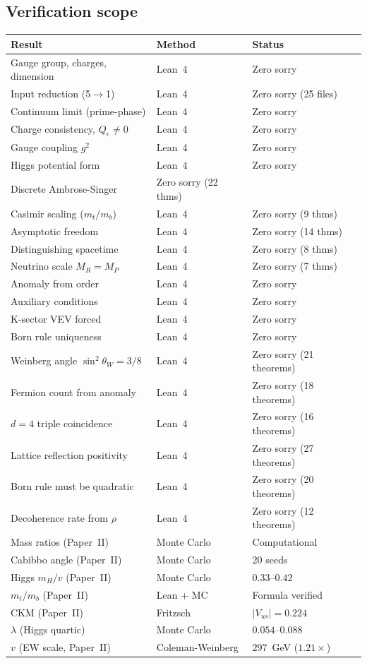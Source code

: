 \documentclass[11pt,letterpaper]{article}
\begin{document}
\subsection{Verification scope}

\begin{center}
\small
\begin{tabular}{@{}lll@{}}
\toprule
Result & Method & Status \\
\midrule
Gauge group, charges, dimension & Lean~4 & Zero sorry \\
Input reduction (5$\to$1) & Lean~4 & Zero sorry (25 files) \\
Continuum limit (prime-phase) & Lean~4 & Zero sorry \\
Charge consistency, $Q_e \neq 0$ & Lean~4 & Zero sorry \\
Gauge coupling $g^2$ & Lean~4 & Zero sorry \\
Higgs potential form & Lean~4 & Zero sorry \\
Discrete Ambrose-Singer & Zero sorry (22 thms) \\
Casimir scaling ($m_t/m_b$) & Lean~4 & Zero sorry (9 thms) \\
Asymptotic freedom & Lean~4 & Zero sorry (14 thms) \\
Distinguishing spacetime & Lean~4 & Zero sorry (8 thms) \\
Neutrino scale $M_R = M_P$ & Lean~4 & Zero sorry (7 thms) \\
Anomaly from order & Lean~4 & Zero sorry \\
Auxiliary conditions & Lean~4 & Zero sorry \\
K-sector VEV forced & Lean~4 & Zero sorry \\
Born rule uniqueness & Lean~4 & Zero sorry \\
Weinberg angle $\sin^2\theta_W = 3/8$ & Lean~4 & Zero sorry (21 theorems) \\
Fermion count from anomaly & Lean~4 & Zero sorry (18 theorems) \\
$d{=}4$ triple coincidence & Lean~4 & Zero sorry (16 theorems) \\
Lattice reflection positivity & Lean~4 & Zero sorry (27 theorems) \\
Born rule must be quadratic & Lean~4 & Zero sorry (20 theorems) \\
Decoherence rate from $\rho$ & Lean~4 & Zero sorry (12 theorems) \\
\midrule
Mass ratios (Paper~II) & Monte Carlo & Computational \\
Cabibbo angle (Paper~II) & Monte Carlo & 20 seeds \\
Higgs $m_H/v$ (Paper~II) & Monte Carlo & $0.33$--$0.42$ \\
$m_t/m_b$ (Paper~II) & Lean + MC & Formula verified \\
CKM (Paper~II) & Fritzsch & $|V_{us}| = 0.224$ \\
$\lambda$ (Higgs quartic) & Monte Carlo & $0.054$--$0.088$ \\
$v$ (EW scale, Paper~II) & Coleman-Weinberg & $297$~GeV ($1.21\times$) \\
\bottomrule
\end{tabular}
\end{center}
\end{document}
